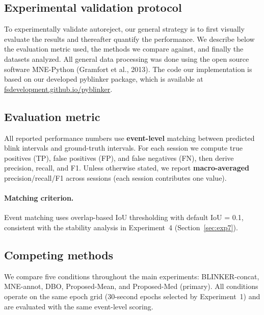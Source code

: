 \subsection{Experimental validation protocol}

To experimentally validate autoreject, our general strategy is to first visually evaluate the results and thereafter quantify the performance. We describe below the evaluation metric
used, the methods we compare against, and finally the datasets analyzed. All general data
processing was done using the open source software MNE-Python (Gramfort et al., 2013). The code our implementation is based on our developed pyblinker package, which is available at \url{fsdevelopment.github.io/pyblinker}.

\subsection{Evaluation metric}
\label{sec:eval_metric_protocol}

All reported performance numbers use \textbf{event-level} matching between predicted blink
intervals and ground-truth intervals. For each session we compute true positives (TP),
false positives (FP), and false negatives (FN), then derive precision, recall, and F1.
Unless otherwise stated, we report \textbf{macro-averaged} precision/recall/F1 across
sessions (each session contributes one value).

\paragraph{Matching criterion.}
Event matching uses overlap-based IoU thresholding with default IoU = 0.1, consistent with
the stability analysis in Experiment~4 (Section~\ref{sec:exp7}).

\subsection{Competing methods}
\label{sec:competing_methods_protocol}

We compare five conditions throughout the main experiments:
BLINKER-concat, MNE-annot, DBO, Proposed-Mean, and Proposed-Med (primary).
All conditions operate on the same epoch grid (30-second epochs selected by Experiment~1)
and are evaluated with the same event-level scoring.
